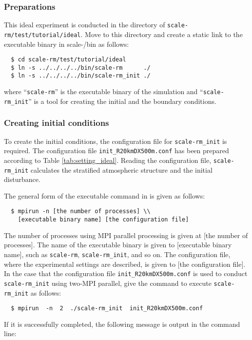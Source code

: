 \subsubsection{Preparations} %

This ideal experiment is conducted in the directory of \verb|scale-rm/test/tutorial/ideal|.  Move to this directory and  create a static link to the executable binary in scale-{\version}/bin as follows:
\begin{verbatim}
  $ cd scale-rm/test/tutorial/ideal
  $ ln -s ../../../../bin/scale-rm      ./
  $ ln -s ../../../../bin/scale-rm_init ./
\end{verbatim}
where ``\verb|scale-rm|'' is the executable binary of the simulation
and  ``\verb|scale-rm_init|'' is a tool for creating the initial and the boundary conditions.


\subsubsection{Creating initial conditions} \label{subsec:ideal_exp_init}

To create the initial conditions, the configuration file for \verb|scale-rm_init| is required.
The configuration file \verb|init_R20kmDX500m.conf| has been prepared
according to Table \ref{tab:setting_ideal}.
Reading the configuration file, \verb|scale-rm_init| calculates the stratified atmospheric structure and the initial disturbance.

The general form of the executable command in \scalerm is given as follows:
\begin{verbatim}
  $ mpirun -n [the number of processes] \\
    [executable binary name] [the configuration file]
\end{verbatim}
The number of processes using MPI parallel processing is given at [the number of processes]. The name of the executable binary is given to [executable binary name],  such as \verb|scale-rm|, \verb|scale-rm_init|, and so on.  The configuration file, where the experimental settings are described, is given to [the configuration file].
In the case that
the configuration file \verb|init_R20kmDX500m.conf| is used to conduct \verb|scale-rm_init| using two-MPI parallel, give the command to execute \verb|scale-rm_init| as follows:
\begin{verbatim}
  $ mpirun  -n  2  ./scale-rm_init  init_R20kmDX500m.conf
\end{verbatim}
\noindent 
If it is successfully completed, the following message is output in the command line:

